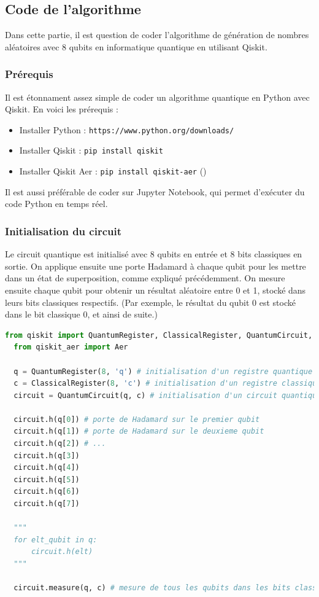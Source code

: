 \documentclass{article}
\begin{document}
\subsection{Code de l'algorithme}

Dans cette partie, il est question de coder l'algorithme de génération de nombres aléatoires avec 8 qubits en informatique quantique en utilisant Qiskit.

\subsubsection{Prérequis}
Il est étonnament assez simple de coder un algorithme quantique en Python avec Qiskit. En voici les prérequis :

\begin{itemize}
  \item Installer Python : \texttt{https://www.python.org/downloads/}
  \item Installer Qiskit : \texttt{pip install qiskit}
  \item Installer Qiskit Aer : \texttt{pip install qiskit-aer} (\cite{qiskitGettingStarted})
\end{itemize}

Il est aussi préférable de coder sur Jupyter Notebook, qui permet d'exécuter du code Python en temps réel.

\subsubsection{Initialisation du circuit}

Le circuit quantique est initialisé avec 8 qubits en entrée et 8 bits classiques en sortie. On applique ensuite une porte Hadamard à chaque qubit pour les mettre dans un état de superposition, comme expliqué précédemment.
On mesure ensuite chaque qubit pour obtenir un résultat aléatoire entre 0 et 1, stocké dans leurs bits classiques respectifs. (Par exemple, le résultat du qubit 0 est stocké dans le bit classique 0, et ainsi de suite.)

\begin{lstlisting}[language=Python, style=mystyle, caption={Initialisation du circuit avec 8 qubits}]
  from qiskit import QuantumRegister, ClassicalRegister, QuantumCircuit, transpile
  from qiskit_aer import Aer
  
  q = QuantumRegister(8, 'q') # initialisation d'un registre quantique de 8 qubits
  c = ClassicalRegister(8, 'c') # initialisation d'un registre classique de 8 bits
  circuit = QuantumCircuit(q, c) # initialisation d'un circuit quantique avec les registres q et c
  
  circuit.h(q[0]) # porte de Hadamard sur le premier qubit
  circuit.h(q[1]) # porte de Hadamard sur le deuxieme qubit
  circuit.h(q[2]) # ...
  circuit.h(q[3])
  circuit.h(q[4])
  circuit.h(q[5])
  circuit.h(q[6])
  circuit.h(q[7])

  """
  for elt_qubit in q:
      circuit.h(elt)
  """
  
  circuit.measure(q, c) # mesure de tous les qubits dans les bits classiques correspondants
\end{lstlisting}
\end{document}
